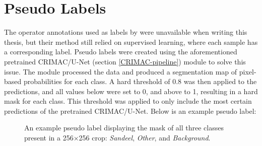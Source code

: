     \section{Pseudo Labels} \label{Pseudo label}
        The operator annotations used as labels by \citeauthor{brautaset2020acoustic}\cite{brautaset2020acoustic} were unavailable when writing this thesis, but their method still relied on supervised learning, where each sample has a corresponding label. Pseudo labels were created using the aforementioned pretrained CRIMAC/U-Net (section \ref{CRIMAC-pipeline}) module to solve this issue. The module processed the data and produced a segmentation map of pixel-based probabilities for each class. A hard threshold of 0.8 was then applied to the predictions, and all values below were set to 0, and above to 1, resulting in a hard mask for each class. This threshold was applied to only include the most certain predictions of the pretrained CRIMAC/U-Net. Below is an example pseudo label:
        

        \begin{figure}[H]
        \centering
        	\label{subfig:correct}
        	
        
        
        
        \caption[Pseudo label]{An example pseudo label displaying the mask of all three classes present in a 256×256 crop: \textit{Sandeel}, \textit{Other}, and \textit{Background}.} %
        \label{data sample fig}
        
        \end{figure}



